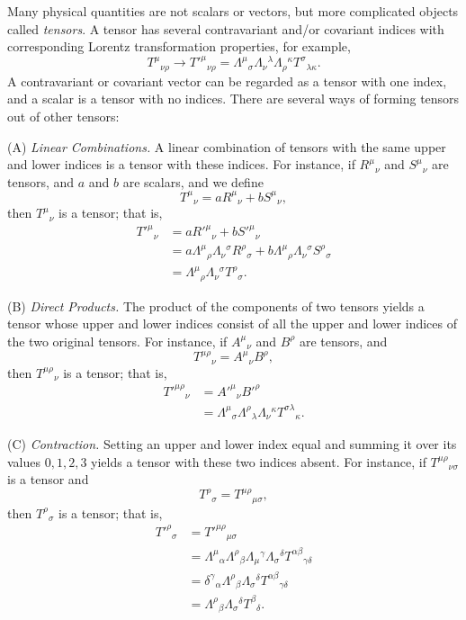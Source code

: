 Many physical quantities are not scalars or vectors, but more complicated
objects called \emph{tensors}. A tensor has several contravariant and/or
covariant indices with corresponding Lorentz transformation properties, for
example,
\[
  T^\mu{}_{\nu\rho}\longrightarrow
  T'^\mu{}_{\nu\rho}
  =\Lambda^\mu{}_\sigma\Lambda_\nu{}^\lambda
   \Lambda_\rho{}^\kappa T^\sigma{}_{\lambda\kappa}.
\]
A contravariant or covariant vector can be regarded as a tensor with one index,
and a scalar is a tensor with no indices. There are several ways of forming
tensors out of other tensors:

\noindent(A) \emph{Linear Combinations.} A linear combination of tensors with
the same upper and lower indices is a tensor with these indices. For instance,
if \(R^\mu{}_\nu\) and \(S^\mu{}_\nu\) are tensors, and \(a\) and \(b\) are
scalars, and we define
\[
  T^\mu{}_\nu=aR^\mu{}_\nu+bS^\mu{}_\nu ,
\]
then \(T^\mu{}_\nu\) is a tensor; that is,
\[
\begin{aligned}
  T'^\mu{}_\nu
  &=aR'^\mu{}_\nu+bS'^\mu{}_\nu\\
  &=a\Lambda^\mu{}_\rho\Lambda_\nu{}^\sigma R^\rho{}_\sigma
   +b\Lambda^\mu{}_\rho\Lambda_\nu{}^\sigma S^\rho{}_\sigma\\
  &=\Lambda^\mu{}_\rho\Lambda_\nu{}^\sigma T^\rho{}_\sigma .
\end{aligned}
\]

\noindent(B) \emph{Direct Products.} The product of the components of two
tensors yields a tensor whose upper and lower indices consist of all the upper
and lower indices of the two original tensors. For instance, if
\(A^\mu{}_\nu\) and \(B^\rho\) are tensors, and
\[
  T^{\mu\rho}{}_\nu=A^\mu{}_\nu B^\rho ,
\]
then \(T^{\mu\rho}{}_\nu\) is a tensor; that is,
\[
\begin{aligned}
  T'^{\mu\rho}{}_\nu
  &=A'^\mu{}_\nu B'^\rho\\
  &=\Lambda^\mu{}_\sigma\Lambda^\rho{}_\lambda
    \Lambda_\nu{}^\kappa T^{\sigma\lambda}{}_\kappa .
\end{aligned}
\]

\noindent(C) \emph{Contraction.} Setting an upper and lower index equal and
summing it over its values \(0,1,2,3\) yields a tensor with these two indices
absent. For instance, if \(T^{\mu\rho}{}_{\nu\sigma}\) is a tensor and
\[
  T^\rho{}_\sigma=T^{\mu\rho}{}_{\mu\sigma},
\]
then \(T^\rho{}_\sigma\) is a tensor; that is,
\[
\begin{aligned}
  T'^\rho{}_\sigma
  &=T'^{\mu\rho}{}_{\mu\sigma}\\
  &=\Lambda^\mu{}_\alpha\Lambda^\rho{}_\beta
    \Lambda_\mu{}^\gamma\Lambda_\sigma{}^\delta
    T^{\alpha\beta}{}_{\gamma\delta}\\
  &=\delta^\gamma{}_\alpha\Lambda^\rho{}_\beta
    \Lambda_\sigma{}^\delta T^{\alpha\beta}{}_{\gamma\delta}\\
  &=\Lambda^\rho{}_\beta\Lambda_\sigma{}^\delta
    T^\beta{}_\delta .
\end{aligned}
\]

